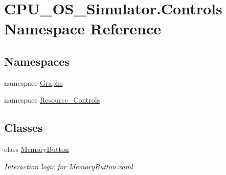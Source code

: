 \hypertarget{namespace_c_p_u___o_s___simulator_1_1_controls}{}\section{C\+P\+U\+\_\+\+O\+S\+\_\+\+Simulator.\+Controls Namespace Reference}
\label{namespace_c_p_u___o_s___simulator_1_1_controls}
\subsection*{Namespaces}
\begin{DoxyCompactItemize}
\item 
namespace \hyperlink{namespace_c_p_u___o_s___simulator_1_1_controls_1_1_graphs}{Graphs}
\item 
namespace \hyperlink{namespace_c_p_u___o_s___simulator_1_1_controls_1_1_resource___controls}{Resource\+\_\+\+Controls}
\end{DoxyCompactItemize}
\subsection*{Classes}
\begin{DoxyCompactItemize}
\item 
class \hyperlink{class_c_p_u___o_s___simulator_1_1_controls_1_1_memory_button}{Memory\+Button}
\begin{DoxyCompactList}\small\item\em Interaction logic for Memory\+Button.\+xaml \end{DoxyCompactList}\end{DoxyCompactItemize}
